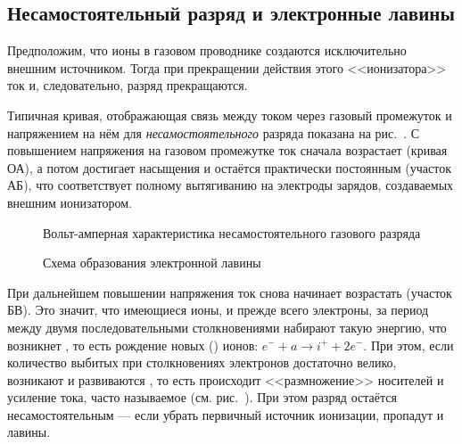 \begin{labsupplement}
\subsection*{Несамостоятельный разряд и электронные лавины}
Предположим, что ионы в газовом проводнике создаются исключительно внешним
источником. Тогда при прекращении действия этого <<ионизатора>> ток и,
следовательно, разряд прекращаются.

Типичная кривая, отображающая связь между током через газовый промежуток и
напряжением на нём для \emph{несамостоятельного} разряда показана на
рис.~. С повышением напряжения
на газовом промежутке ток сначала возрастает (кривая ОА), а потом достигает
насыщения и остаётся практически постоянным (участок АБ), что соответствует
полному вытягиванию на электроды зарядов, создаваемых внешним ионизатором.

\begin{figure}[h]
    \centering
    \caption{Вольт-амперная характеристика несамостоятельного газового разряда}
\end{figure}

\begin{figure}[h]
    \centering
    \caption{Схема образования электронной лавины}
\end{figure}

При дальнейшем повышении напряжения ток снова начинает возрастать (участок БВ).
Это значит, что имеющиеся ионы, и прежде всего электроны, за период между двумя
последовательными столкновениями набирают такую энергию, что возникнет
, то есть рождение новых 
() ионов: $e^{-}+a\to i^{+} + 2 e^{-}$. При этом,
если количество выбитых при столкновениях электронов достаточно велико,
возникают и развиваются ,
то есть происходит <<размножение>> носителей и усиление тока,
часто называемое  (см. рис.~).
При этом разряд остаётся несамостоятельным --- если убрать первичный источник
ионизации, пропадут и лавины.




\end{labsupplement}
